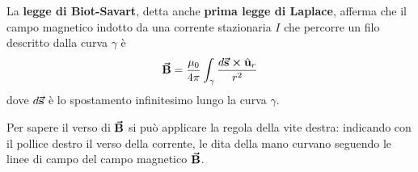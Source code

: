 \begin{define}
	La \textbf{legge di Biot-Savart}, detta anche \textbf{prima legge di Laplace}, afferma che il campo magnetico indotto da una corrente stazionaria $I$ che percorre un filo descritto dalla curva $\gamma$ è
	\begin{equation}
		\vb*{\va{B}}=\frac{\mu_0}{4\pi}\int_{\gamma}\frac{d\vb*{\va{s}}\cross\hat{\mathbf{u}}_r}{r^2}
	\end{equation}
	dove $d\vb*{\va{s}}$ è lo spostamento infinitesimo lungo la curva $\gamma$.
\end{define}
\begin{observe}
	Per sapere il verso di $\vb*{\va{B}}$ si può applicare la regola della vite destra: indicando con il pollice destro il verso della corrente, le dita della mano curvano seguendo le linee di campo del campo magnetico $\vb*{\va{B}}$.
\end{observe}
